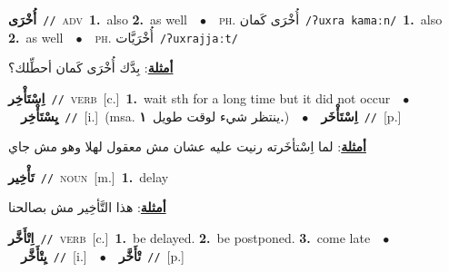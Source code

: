 \documentclass[10pt,a4paper,twoside]{article} %
\begin{document}
\begin{multicols}{2}
{{{{{{{{\setlength\topsep{0pt}\textbf{\foreignlanguage{arabic}{أُخْرَى}}\ {\color{gray}\texttt{//}\color{black}}\ \textsc{adv}\ \textbf{1.}~also  \textbf{2.}~as well\ \ $\bullet$\ \ \textsc{ph.} \color{gray} \foreignlanguage{arabic}{أُخْرَى كَمان}\color{black}\ {\color{gray}\texttt{/{\sffamily ʔuxra kamaːn}/}\color{black}}\ \textbf{1.}~also  \textbf{2.}~as well\ \ $\bullet$\ \ \textsc{ph.} \color{gray} \foreignlanguage{arabic}{أُخْرَيَّات}\color{black}\ {\color{gray}\texttt{/{\sffamily ʔuxrajjaːt}/}\color{black}}\  \begin{flushright}\color{gray}\foreignlanguage{arabic}{\textbf{\underline{\foreignlanguage{arabic}{أمثلة}}}: بِدَّك أُخْرَى كَمان أحطِّلك؟}\end{flushright}\color{black}} \vspace{2mm}

{\setlength\topsep{0pt}\textbf{\foreignlanguage{arabic}{اِسْتَأْخِر}}\ {\color{gray}\texttt{//}\color{black}}\ \textsc{verb}\ [c.]\ \textbf{1.}~wait sth for a long time but it did not occur\ \ $\bullet$\ \ \setlength\topsep{0pt}\textbf{\foreignlanguage{arabic}{يِسْتَأْخِر}}\ {\color{gray}\texttt{//}\color{black}}\ [i.]\ \color{gray}(msa. \foreignlanguage{arabic}{ينتظر شيء لوقت طويل}~\foreignlanguage{arabic}{\textbf{١.}})\color{black}\ \ $\bullet$\ \ \setlength\topsep{0pt}\textbf{\foreignlanguage{arabic}{اِسْتَأْخَر}}\ {\color{gray}\texttt{//}\color{black}}\ [p.]\  \begin{flushright}\color{gray}\foreignlanguage{arabic}{\textbf{\underline{\foreignlanguage{arabic}{أمثلة}}}: لما اِسْتأخَرته رنيت عليه عشان مش معقول لهلا وهو مش جاي}\end{flushright}\color{black}} \vspace{2mm}

{\setlength\topsep{0pt}\textbf{\foreignlanguage{arabic}{تَأْخِير}}\ {\color{gray}\texttt{//}\color{black}}\ \textsc{noun}\ [m.]\ \textbf{1.}~delay\  \begin{flushright}\color{gray}\foreignlanguage{arabic}{\textbf{\underline{\foreignlanguage{arabic}{أمثلة}}}: هذا التَّأخِير مش بصالحنا}\end{flushright}\color{black}} \vspace{2mm}

{\setlength\topsep{0pt}\textbf{\foreignlanguage{arabic}{اِتْأَخَّر}}\ {\color{gray}\texttt{//}\color{black}}\ \textsc{verb}\ [c.]\ \textbf{1.}~be delayed.  \textbf{2.}~be postponed.  \textbf{3.}~come late\ \ $\bullet$\ \ \setlength\topsep{0pt}\textbf{\foreignlanguage{arabic}{يِتْأَخَّر}}\ {\color{gray}\texttt{//}\color{black}}\ [i.]\ \ $\bullet$\ \ \setlength\topsep{0pt}\textbf{\foreignlanguage{arabic}{تْأَخَّر}}\ {\color{gray}\texttt{//}\color{black}}\ [p.]\ 

}}}}}}}}
\end{multicols}
\end{document}
